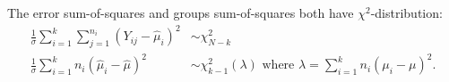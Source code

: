%

\begin{lemma}
The error sum-of-squares and groups sum-of-squares both have $\chi^2$-distribution:
\[\begin{array}{ll}
\displaystyle\frac{1}{\sigma}\sum_{i=1}^k\sum_{j=1}^{n_i} (Y_{ij}-\hat{\mu}_i)^2 
	& \sim \chi^2_{N-k} \\[2ex]
\displaystyle\frac{1}{\sigma}\sum_{i=1}^k n_i (\hat{\mu}_i-\hat{\mu})^2	
	& \sim \chi^2_{k-1}(\lambda)\text{ where }\lambda = \displaystyle\sum_{i=1}^k n_i(\mu_i-\mu)^2.
\end{array}\]
\end{lemma}
